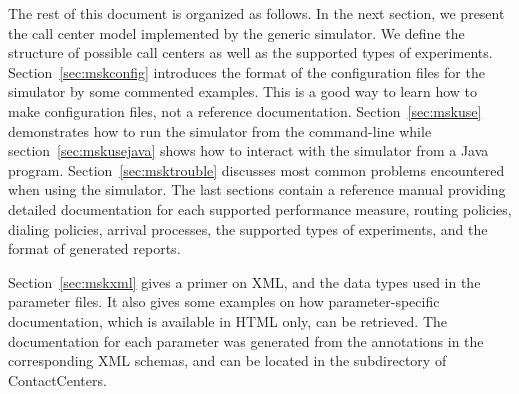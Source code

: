 
The rest of this document is organized as follows.
In the next section, we present the call center model
implemented by the generic simulator.  We define the structure of
possible call centers as well as the supported types
of experiments.
Section~\ref{sec:mskconfig} introduces the format of the configuration
files for the simulator by some commented examples.  This is
a good way to learn how to make configuration files, not a
reference documentation.
Section~\ref{sec:mskuse} demonstrates how to run the
simulator from the command-line while section~\ref{sec:mskusejava}
shows how to interact with the simulator from a Java program.
Section~\ref{sec:msktrouble} discusses most common problems encountered
when using the simulator.
The last sections contain a reference manual
providing detailed documentation for each supported performance measure,
routing policies, dialing policies, arrival processes, the
supported types of experiments, and the format of generated reports.

Section~\ref{sec:mskxml}
gives a primer on XML, and the data types used in the
parameter files.
It also gives some examples on how parameter-specific documentation,
which is available in HTML only, can be retrieved.
The documentation for
each parameter was generated from the annotations in the
corresponding XML schemas, and can be located
in the  subdirectory of ContactCenters.
